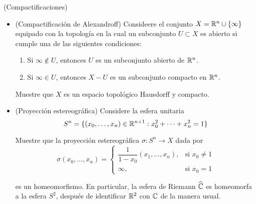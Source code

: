 \begin{exercise}
(Compactificaciones)

\begin{itemize}
    \item (Compactificación de Alexandroff) Consideere el conjunto $X = \mathbb R^n \cup \{ \infty \}$ equipado con la topología en la cual un subconjunto $U \subset X$ es abierto si cumple una de las siguientes condiciones:
    \begin{enumerate}[label=\alph*)]
        \item Si $\infty \notin U$, entonces $U$ es un subconjunto abierto de $\mathbb R^n$.
        \item Si $\infty \in U$, entonces $X - U$ es un subconjunto compacto en $\mathbb R^n$.
    \end{enumerate}
    
    Muestre que $X$ es un espacio topológico Hausdorff y compacto.

    \item (Proyección estereográfica) Considere la esfera unitaria
    $$S^n = \{ (x_0, \dots, x_n) \in \mathbb R^{n+1} : x_0^2 + \dots + x_n^2 = 1 \}$$
    
    Muestre que la proyección estereográfica $\sigma : S^n \to X$ dada por
    $$
    \sigma(x_0, \dots, x_n) =
    \begin{cases}
        \dfrac 1 {1 - x_0} (x_1, \dots, x_n), & \text{si } x_0 \ne 1 \\
        \infty, & \text{si } x_0 = 1
    \end{cases}
    $$
    
    es un homeomorfismo. En particular, la esfera de Riemann $\widehat {\mathbb C}$ es homeomorfa a la esfera $S^2$, después de identificar $\mathbb R^2$ con $\mathbb C$ de la manera usual.
\end{itemize}
\end{exercise}

